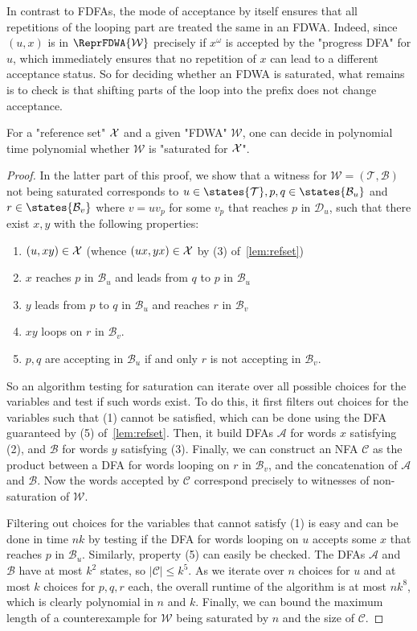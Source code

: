 \documentclass[a4paper,USenglish,cleveref,autoref,thm-restate]{lipics-v2021}
\newcommand{\mc}[1]{\ensuremath{\mathcal{#1}}}
\newcommand{\A}{\mc{A}}
\newcommand{\T}{\mc{T}}
\newcommand{\D}{\mc{D}}
\newcommand{\C}{\mc{C}}
\newcommand{\B}{\mc{B}}
\newcommand{\W}{\mc{W}}
\begin{document}
{In contrast to FDFAs, the mode of acceptance by itself ensures that all repetitions of the looping part are treated the same in an FDWA.
Indeed, since $(u,x)$ is in $\ReprFDWA{\W}$ precisely if $x^\omega$ is accepted by the "progress DFA" for $u$, which immediately ensures that no repetition of $x$ can lead to a different acceptance status.
So for deciding whether an FDWA is saturated, what remains is to check is that shifting parts of the loop into the prefix does not change acceptance.

\begin{theorem}
  For a "reference set" $\mathcal{X}$ and a given "FDWA" $\W$, one can decide in polynomial time polynomial whether $\W$ is "saturated for $\mathcal{X}$".
  \label{app:theorem:ptimesaturationFDWA}
\end{theorem}
\begin{proof}
In the latter part of this proof, we show that a witness for $\W = (\T, \B)$ not being saturated corresponds to $u \in \states{\T}, p,q \in \states{\B_u}$ and $r \in \states{\B_v}$ where $v = uv_p$ for some $v_p$ that reaches $p$ in $\D_u$, such that there exist $x, y$ with the following properties:
  \begin{enumerate}
      \item $(u,xy) \in \mathcal{X}$ (whence $(ux,yx) \in \mathcal{X}$ by (3) of~\cref{lem:refset})
      \item $x$ reaches $p$ in $\B_u$ and leads from $q$ to $p$ in $\B_u$
      \item $y$ leads from $p$ to $q$ in $\B_u$ and reaches $r$ in $\B_v$
      \item $xy$ loops on $r$ in $\B_v$.
      \item $p,q$ are accepting in $\B_u$ if and only $r$ is not accepting in $\B_v$.
  \end{enumerate}
  So an algorithm testing for saturation can iterate over all possible choices for the variables and test if such words exist.
  To do this, it first filters out choices for the variables such that (1) cannot be satisfied, which can be done using the DFA guaranteed by (5) of~\cref{lem:refset}.
  Then, it build DFAs $\A$ for words $x$ satisfying (2), and $\B$ for words $y$ satisfying (3).
  Finally, we can construct an NFA $\C$ as the product between a DFA for words looping on $r$ in $\B_v$, and the concatenation of $\A$ and $\B$.
  Now the words accepted by $\C$ correspond precisely to witnesses of non-saturation of $\W$.

  Filtering out choices for the variables that cannot satisfy (1) is easy and can be done in time $nk$ by testing if the DFA for words looping on $u$ accepts some $x$ that reaches $p$ in $\B_u$.
  Similarly, property (5) can easily be checked.
  The DFAs $\A$ and $\B$ have at most $k^2$ states, so $|\C| \leq k^5$.
  As we iterate over $n$ choices for $u$ and at most $k$ choices for $p,q,r$ each, the overall runtime of the algorithm is at most $nk^8$, which is clearly polynomial in $n$ and $k$.
  Finally, we can bound the maximum length of a counterexample for $\W$ being saturated by $n$ and the size of $\C$.
  

\end{proof}}
\end{document}
